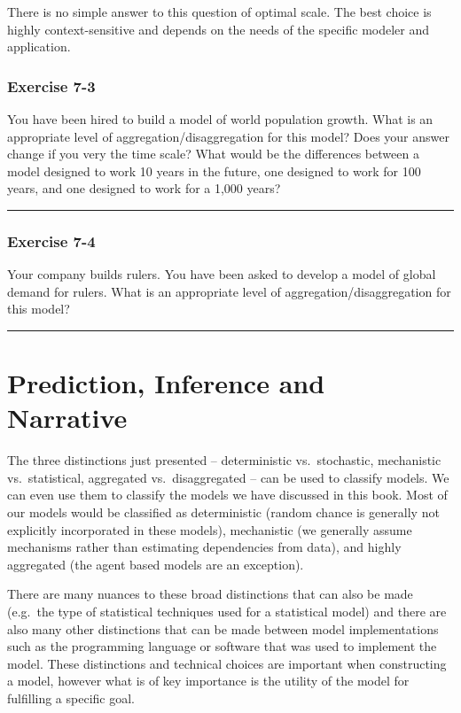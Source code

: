 \documentclass[]{memoir}
\begin{document}
There is no simple answer to this question of optimal scale. The best
choice is highly context-sensitive and depends on the needs of the
specific modeler and application.

\subsubsection{Exercise 7-3}

You have been hired to build a model of world population growth. What is
an appropriate level of aggregation/disaggregation for this model? Does
your answer change if you very the time scale? What would be the
differences between a model designed to work 10 years in the future, one
designed to work for 100 years, and one designed to work for a 1,000
years?

\begin{center}\rule{3in}{0.4pt}\end{center}

\subsubsection{Exercise 7-4}

Your company builds rulers. You have been asked to develop a model of
global demand for rulers. What is an appropriate level of
aggregation/disaggregation for this model?

\begin{center}\rule{3in}{0.4pt}\end{center}

\section{Prediction, Inference and Narrative}

The three distinctions just presented -- deterministic vs.~stochastic,
mechanistic vs.~statistical, aggregated vs.~disaggregated -- can be used
to classify models. We can even use them to classify the models we have
discussed in this book. Most of our models would be classified as
deterministic (random chance is generally not explicitly incorporated in
these models), mechanistic (we generally assume mechanisms rather than
estimating dependencies from data), and highly aggregated (the agent
based models are an exception).

There are many nuances to these broad distinctions that can also be made
(e.g.~the type of statistical techniques used for a statistical model)
and there are also many other distinctions that can be made between
model implementations such as the programming language or software that
was used to implement the model. These distinctions and technical
choices are important when constructing a model, however what is of key
importance is the utility of the model for fulfilling a specific goal.
\end{document}
